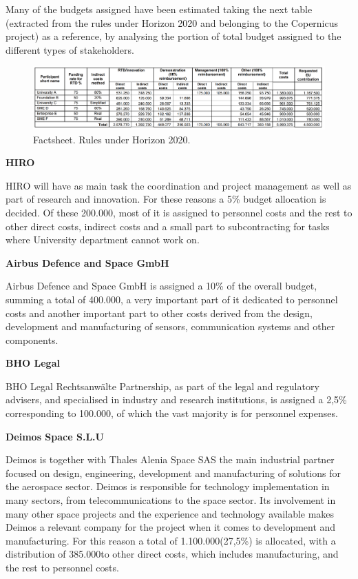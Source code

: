 Many of the budgets assigned have been estimated taking the next table (extracted from the rules under Horizon 2020 and belonging to the Copernicus project) as a reference, by analysing the portion of total budget assigned to the different types of stakeholders.


\begin{figure}[H]
\centering
\includegraphics[scale=0.45]{./images/budget/rulesBudget2020}
\caption{Factsheet. Rules under Horizon 2020.}
\label{rules}
\end{figure}

\textbf{HIRO}

HIRO will have as main task the coordination and project management as well as part of research and innovation. For these reasons a 5\% budget allocation is decided. Of these 200.000\EUR, most of it is assigned to personnel costs and the rest to other direct costs, indirect costs and a small part to subcontracting for tasks where University department cannot work on.
 
\textbf{Airbus Defence and Space GmbH}

Airbus Defence and Space GmbH is assigned a 10\% of the overall budget, summing a total of 400.000\EUR, a very important part of it dedicated to personnel costs and another important part to other costs derived from the design, development and manufacturing of sensors, communication systems and other components.

\textbf{BHO Legal}

BHO Legal Rechtsanwälte Partnership, as part of the legal and regulatory advisers, and specialised in industry and research institutions, is assigned a 2,5\% corresponding to 100.000\EUR, of which the vast majority is for personnel expenses.

\textbf{Deimos Space S.L.U}

Deimos is together with Thales Alenia Space SAS the main industrial partner focused on design, engineering, development and manufacturing of solutions for the aerospace sector. Deimos is responsible for technology implementation in many sectors, from telecommunications to the space sector. Its involvement in many other space projects and the experience and technology available makes Deimos a relevant company for the project when it comes to development and manufacturing. For this reason a total of 1.100.000\EUR (27,5\%) is allocated, with a distribution of 385.000\EUR to other direct costs, which includes manufacturing, and the rest to personnel costs.
 
